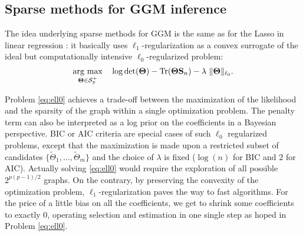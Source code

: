 \subsection{Sparse methods for GGM inference}
\label{sec:sparseGGM}

The idea underlying sparse methods for GGM is the same as for the
Lasso in linear regression \citep{1996_JRSS_Tibshirani}: it basically
uses $\ell_1$-regularization as a convex surrogate of the ideal but
computationally intensive $\ell_0$-regularized problem:
\begin{equation}
  \argmax_{\invcov  \in \mathcal{S}_p^+}\quad
  \log \det(\invcov) - \trace(\invcov \empcov) - \lambda\ 
  \|\invcov\|_{\ell_0}.
  \label{eq:ell0}
\end{equation}

Problem \eqref{eq:ell0} achieves a trade-off between the maximization
of the likelihood and the sparsity of the graph within a single
optimization problem.  The penalty term can also be interpreted as a
log prior on the coefficients in a Bayesian perspective. BIC or AIC
criteria are special cases of such $\ell_0$ regularized problems,
except that the maximization is made upon a restricted subset of
candidates $\{\tilde{\Theta}_1,\dots, \tilde{\Theta}_m\}$ and the
choice of $\lambda$ is fixed ($\log(n)$ for BIC and $2$ for AIC).
Actually solving \eqref{eq:ell0} would require the exploration of all
possible $2^{p(p-1)/2}$ graphs.  On the contrary, by preserving the
convexity of the optimization problem, $\ell_1$-regularization paves
the way to fast algorithms.  For the price of a little bias on all the
coefficients, we get to shrink some coefficients to exactly 0,
operating selection and estimation in one single step as hoped in
Problem \eqref{eq:ell0}.

